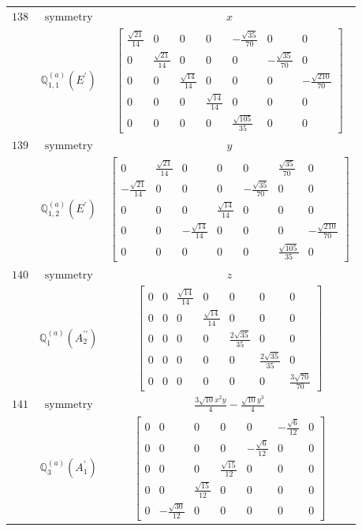 \documentclass[fleqn,8pt,landscape]{jsarticle}
\begin{document}
\begin{longtable}{ccc}
$ 138 $ & $ \text{symmetry} $ & $ x $ \\
$  $ & $ \mathbb{Q}_{1,1}^{(a)}(E^{\prime}) $ & $ \begin{bmatrix} \frac{\sqrt{21}}{14} & 0 & 0 & 0 & - \frac{\sqrt{35}}{70} & 0 & 0 \\ 0 & \frac{\sqrt{21}}{14} & 0 & 0 & 0 & - \frac{\sqrt{35}}{70} & 0 \\ 0 & 0 & \frac{\sqrt{14}}{14} & 0 & 0 & 0 & - \frac{\sqrt{210}}{70} \\ 0 & 0 & 0 & \frac{\sqrt{14}}{14} & 0 & 0 & 0 \\ 0 & 0 & 0 & 0 & \frac{\sqrt{105}}{35} & 0 & 0 \end{bmatrix} $ \\ \hline
$ 139 $ & $ \text{symmetry} $ & $ y $ \\
$  $ & $ \mathbb{Q}_{1,2}^{(a)}(E^{\prime}) $ & $ \begin{bmatrix} 0 & \frac{\sqrt{21}}{14} & 0 & 0 & 0 & \frac{\sqrt{35}}{70} & 0 \\ - \frac{\sqrt{21}}{14} & 0 & 0 & 0 & - \frac{\sqrt{35}}{70} & 0 & 0 \\ 0 & 0 & 0 & \frac{\sqrt{14}}{14} & 0 & 0 & 0 \\ 0 & 0 & - \frac{\sqrt{14}}{14} & 0 & 0 & 0 & - \frac{\sqrt{210}}{70} \\ 0 & 0 & 0 & 0 & 0 & \frac{\sqrt{105}}{35} & 0 \end{bmatrix} $ \\ \hline
$ 140 $ & $ \text{symmetry} $ & $ z $ \\
$  $ & $ \mathbb{Q}_{1}^{(a)}(A_{2}^{\prime\prime}) $ & $ \begin{bmatrix} 0 & 0 & \frac{\sqrt{14}}{14} & 0 & 0 & 0 & 0 \\ 0 & 0 & 0 & \frac{\sqrt{14}}{14} & 0 & 0 & 0 \\ 0 & 0 & 0 & 0 & \frac{2 \sqrt{35}}{35} & 0 & 0 \\ 0 & 0 & 0 & 0 & 0 & \frac{2 \sqrt{35}}{35} & 0 \\ 0 & 0 & 0 & 0 & 0 & 0 & \frac{3 \sqrt{70}}{70} \end{bmatrix} $ \\ \hline
$ 141 $ & $ \text{symmetry} $ & $ \frac{3 \sqrt{10} x^{2} y}{4} - \frac{\sqrt{10} y^{3}}{4} $ \\
$  $ & $ \mathbb{Q}_{3}^{(a)}(A_{1}^{\prime}) $ & $ \begin{bmatrix} 0 & 0 & 0 & 0 & 0 & - \frac{\sqrt{6}}{12} & 0 \\ 0 & 0 & 0 & 0 & - \frac{\sqrt{6}}{12} & 0 & 0 \\ 0 & 0 & 0 & \frac{\sqrt{15}}{12} & 0 & 0 & 0 \\ 0 & 0 & \frac{\sqrt{15}}{12} & 0 & 0 & 0 & 0 \\ 0 & - \frac{\sqrt{30}}{12} & 0 & 0 & 0 & 0 & 0 \end{bmatrix} $ \\ \hline

\end{longtable}
\end{document}
